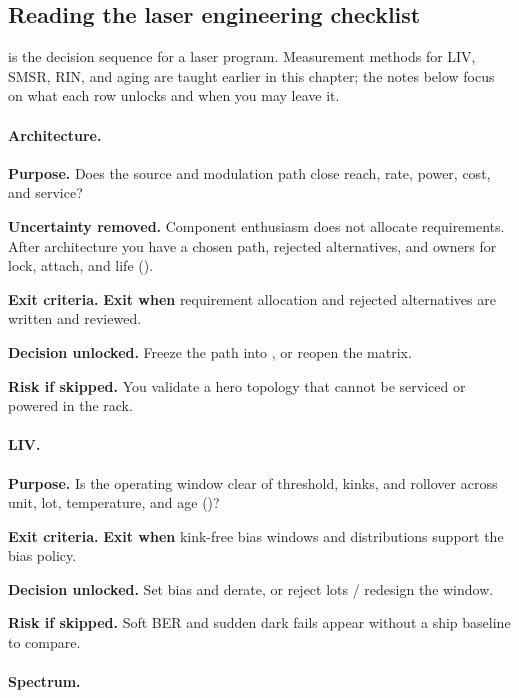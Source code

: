 \subsection{Reading the laser engineering checklist}
\label{sec:lasers-checklist-read}

 is the decision sequence for a laser
program. Measurement methods for LIV, SMSR, RIN, and aging are taught earlier
in this chapter; the notes below focus on what each row unlocks and when you
may leave it.

\paragraph{Architecture.}

\textbf{Purpose.}
Does the source and modulation path close reach, rate, power, cost, and
service?

\textbf{Uncertainty removed.}
Component enthusiasm does not allocate requirements. After architecture you
have a chosen path, rejected alternatives, and owners for lock, attach, and
life ().

\textbf{Exit criteria.}
\textbf{Exit when} requirement allocation and rejected alternatives are
written and reviewed.

\textbf{Decision unlocked.}
Freeze the path into , or reopen the matrix.

\textbf{Risk if skipped.}
You validate a hero topology that cannot be serviced or powered in the rack.

\paragraph{LIV.}

\textbf{Purpose.}
Is the operating window clear of threshold, kinks, and rollover across unit,
lot, temperature, and age ()?

\textbf{Exit criteria.}
\textbf{Exit when} kink-free bias windows and distributions support the
bias policy.

\textbf{Decision unlocked.}
Set bias and derate, or reject lots / redesign the window.

\textbf{Risk if skipped.}
Soft BER and sudden dark fails appear without a ship baseline to compare.

\paragraph{Spectrum.}

